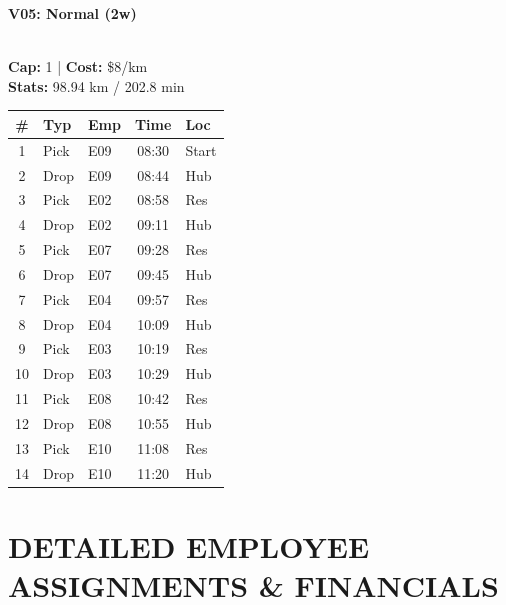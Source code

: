 \documentclass[a4paper,11pt]{article}
\begin{document}
\begin{minipage}[t]{0.32\textwidth}
    \centering
    \colorbox{velorablue}{\parbox{\dimexpr\linewidth-2\fboxsep}{\centering \color{white}\textbf{V05: Normal (2w)}}} \\
    \vspace{0.05cm}
    {\scriptsize \textbf{Cap:} 1 | \textbf{Cost:} \$8/km \\ \textbf{Stats:} 98.94 km / 202.8 min}
    \vspace{0.1cm}
    
    \renewcommand{\arraystretch}{1.0} %
    \setlength{\tabcolsep}{2pt}
    \scriptsize
    \begin{tabular}{c l l c l}
        \toprule
        \textbf{\#} & \textbf{Typ} & \textbf{Emp} & \textbf{Time} & \textbf{Loc} \\
        \midrule
        1 & Pick & E09 & 08:30 & Start \\
        \rowcolor{headergray} 2 & Drop & E09 & 08:44 & Hub \\
        3 & Pick & E02 & 08:58 & Res \\
        \rowcolor{headergray} 4 & Drop & E02 & 09:11 & Hub \\
        5 & Pick & E07 & 09:28 & Res \\
        \rowcolor{headergray} 6 & Drop & E07 & 09:45 & Hub \\
        7 & Pick & E04 & 09:57 & Res \\
        \rowcolor{headergray} 8 & Drop & E04 & 10:09 & Hub \\
        9 & Pick & E03 & 10:19 & Res \\
        \rowcolor{headergray} 10 & Drop & E03 & 10:29 & Hub \\
        11 & Pick & E08 & 10:42 & Res \\
        \rowcolor{headergray} 12 & Drop & E08 & 10:55 & Hub \\
        13 & Pick & E10 & 11:08 & Res \\
        \rowcolor{headergray} 14 & Drop & E10 & 11:20 & Hub \\
        \bottomrule
    \end{tabular}
\end{minipage}

\vspace{0.4cm}

\section*{\uppercase{\color{velorablue} Detailed Employee Assignments \& Financials}}
\vspace{-0.2cm}
\end{document}
